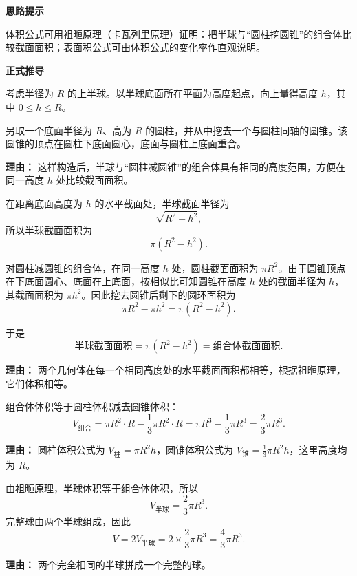 \begin{proofbox}
\textbf{\textcolor{CProof}{思路提示}}

体积公式可用祖暅原理（卡瓦列里原理）证明：把半球与“圆柱挖圆锥”的组合体比较截面面积；表面积公式可由体积公式的变化率作直观说明。

\medskip
\textbf{\textcolor{CProof}{正式推导}}
\begin{description}[style=nextline, leftmargin=2.8em, labelsep=0.5em, itemsep=0.55em]
\item[\textbf{步骤一（建立半球模型）：}] 考虑半径为 $R$ 的上半球。以半球底面所在平面为高度起点，向上量得高度 $h$，其中 $0\le h\le R$。

另取一个底面半径为 $R$、高为 $R$ 的圆柱，并从中挖去一个与圆柱同轴的圆锥。该圆锥的顶点在圆柱下底面圆心，底面与圆柱上底面重合。




\par\textbf{理由：} 这样构造后，半球与“圆柱减圆锥”的组合体具有相同的高度范围，方便在同一高度 $h$ 处比较截面面积。

\item[\textbf{步骤二（比较截面面积）：}] 在距离底面高度为 $h$ 的水平截面处，半球截面半径为
\[
\sqrt{R^{2}-h^{2}},
\]
所以半球截面面积为
\[
\pi\left(R^{2}-h^{2}\right).
\]

对圆柱减圆锥的组合体，在同一高度 $h$ 处，圆柱截面面积为 $\pi R^{2}$。由于圆锥顶点在下底面圆心、底面在上底面，按相似比可知圆锥在高度 $h$ 处的截面半径为 $h$，其截面面积为 $\pi h^{2}$。因此挖去圆锥后剩下的圆环面积为
\[
\pi R^{2}-\pi h^{2}=\pi\left(R^{2}-h^{2}\right).
\]

于是
\[
\text{半球截面面积}=\pi\left(R^{2}-h^{2}\right)=\text{组合体截面面积}.
\]
\par\textbf{理由：} 两个几何体在每一个相同高度处的水平截面面积都相等，根据祖暅原理，它们体积相等。

\item[\textbf{步骤三（求组合体体积）：}] 组合体体积等于圆柱体积减去圆锥体积：
\[
V_{\text{组合}}
=\pi R^{2}\cdot R-\frac{1}{3}\pi R^{2}\cdot R
=\pi R^{3}-\frac{1}{3}\pi R^{3}
=\frac{2}{3}\pi R^{3}.
\]
\par\textbf{理由：} 圆柱体积公式为 $V_{\text{柱}}=\pi R^{2}h$，圆锥体积公式为 $V_{\text{锥}}=\frac{1}{3}\pi R^{2}h$，这里高度均为 $R$。

\item[\textbf{步骤四（得到半球体积与球体积）：}] 由祖暅原理，半球体积等于组合体体积，所以
\[
V_{\text{半球}}=\frac{2}{3}\pi R^{3}.
\]
完整球由两个半球组成，因此
\[
V=2V_{\text{半球}}
=2\times \frac{2}{3}\pi R^{3}
=\frac{4}{3}\pi R^{3}.
\]
\par\textbf{理由：} 两个完全相同的半球拼成一个完整的球。


\end{description}
\end{proofbox}
